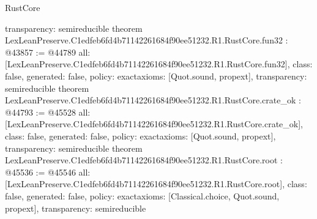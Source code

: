\begin{lexlean}{RustCore}
\begin{coremodule}
{  transparency: semireducible
}
theorem LexLeanPreserve.C1edfeb6fd4b71142261684f90ee51232.R1.RustCore.fun32 : @43857 := @44789 {
  all: [LexLeanPreserve.C1edfeb6fd4b71142261684f90ee51232.R1.RustCore.fun32],
  class: false,
  generated: false,
  policy: exact{axioms: [Quot.sound, propext]},
  transparency: semireducible
}
theorem LexLeanPreserve.C1edfeb6fd4b71142261684f90ee51232.R1.RustCore.crate_ok : @44793 := @45528 {
  all: [LexLeanPreserve.C1edfeb6fd4b71142261684f90ee51232.R1.RustCore.crate_ok],
  class: false,
  generated: false,
  policy: exact{axioms: [Quot.sound, propext]},
  transparency: semireducible
}
theorem LexLeanPreserve.C1edfeb6fd4b71142261684f90ee51232.R1.RustCore.root : @45536 := @45546 {
  all: [LexLeanPreserve.C1edfeb6fd4b71142261684f90ee51232.R1.RustCore.root],
  class: false,
  generated: false,
  policy: exact{axioms: [Classical.choice, Quot.sound, propext]},
  transparency: semireducible
}


\end{coremodule}
\end{lexlean}
